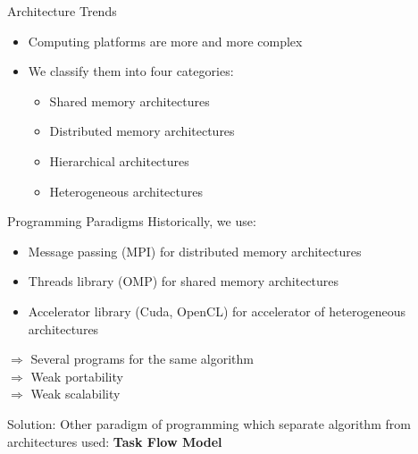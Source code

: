 \begin{frame}{Architecture Trends}
\begin{itemize}
\item Computing platforms are more and more complex
\item We classify them into four categories:
\begin{itemize}
\item Shared memory architectures
\item Distributed memory architectures
\item Hierarchical architectures
\item Heterogeneous architectures
\end{itemize}
\end{itemize}
\end{frame}


\begin{frame}{Programming Paradigms}
Historically, we use:
\begin{itemize}
\item Message passing (MPI) for distributed memory architectures
\item Threads library (OMP) for shared memory architectures
\item Accelerator library (Cuda, OpenCL) for accelerator of heterogeneous architectures
\end{itemize}
\pause
$\Rightarrow$ Several programs for the same algorithm\\
$\Rightarrow$ Weak portability\\
$\Rightarrow$ Weak scalability\\
\pause
\begin{exampleblock}{Solution:}
Other paradigm of programming which separate algorithm from architectures used: \textbf{Task Flow Model}
\end{exampleblock}
\end{frame}

